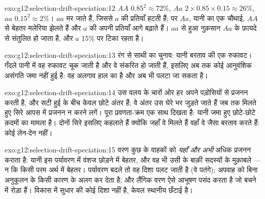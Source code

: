 \begin{solution}{exo:g12:selection-drift-speciation:12}
$AA$ $0.85^2 \approx 72\%$, $Aa$ $2 \times 0.85 \times 0.15 \approx
26\%$, $aa$ $0.15^2 \approx 2\%$। $aa$ मर जाते हैं, जिससे $a$ की
प्रतियाँ हटती हैं; पर $Aa$, यानी  का एक चौथाई, $AA$ से बेहतर मलेरिया
झेलते हैं और $a$ की अपनी प्रतियाँ आगे बढ़ाते हैं। $aa$ से हुआ नुक़सान
$Aa$ के फ़ायदे से संतुलित हो जाता है, और $a$ 15\% पर टिका रहता है।
\end{solution}

\begin{solution}{exo:g12:selection-drift-speciation:13}
रंग से साथी का चुनाव: यानी बरताव की एक रुकावट। गँदले पानी में वह रुकावट चूक
जाती है और वे  संकरित हो जाती हैं, इसलिए अब तक कोई आनुवंशिक
असंगति जमा नहीं हुई है: वह अलगाव हाल का है और अब भी पलटा जा सकता है।
\end{solution}

\begin{solution}{exo:g12:selection-drift-speciation:14}
उस वलय के चारों ओर हर  अपने पड़ोसियों से प्रजनन करती है, और सटी हुई
 के बीच केवल छोटे अंतर हैं; वे अंतर उस घेरे भर जुड़ते जाते हैं जब तक
मिलते हुए सिरे आपस में प्रजनन न करने लगें। पूरा प्रवणता-क्रम एक साथ दिखता
है: यानी  जमा हुए छोटे-छोटे क़दमों का मामला है। दोनों सिरे इसलिए
 कहलाते हैं क्योंकि जहाँ वे मिलते हैं वहाँ वे  जैसा बरताव
करते हैं: कोई  लेन-देन नहीं।
\end{solution}

\begin{solution}{exo:g12:selection-drift-speciation:15}
वरण कुछ  के वाहकों को \emph{यहाँ और अभी} अधिक प्रजनन कराता
है: यानी इस पर्यावरण में वंशज छोड़ने में बेहतर, और वह भी उसी  के बाक़ी
सदस्यों के मुक़ाबले --- न कि किसी परम अर्थ में बेहतर। पर्यावरण बदले तो वह
दिशा पलट जाती है (वे पतंगे); अपवाह  को बिना अनुकूलन के किसी कारण के
अलग कर देता है; और लैंगिक वरण ऐसे आभूषण पसंद करता है जो बचने में रोड़ा हैं।
विकास में सुधार की कोई दिशा नहीं है, केवल स्थानीय छँटाई है।
\end{solution}

